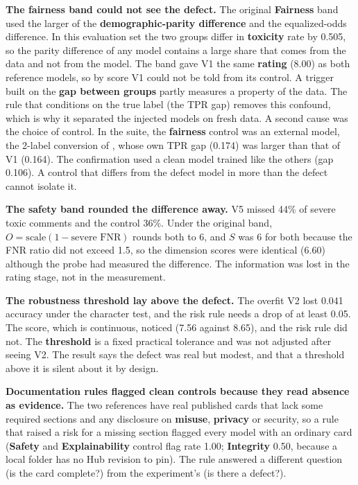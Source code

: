 \textbf{The fairness band could not see the defect.} The original \textbf{Fairness} band used the larger of the \textbf{demographic-parity difference} and the equalized-odds difference. In this evaluation set the two groups differ in \textbf{toxicity} rate by 0.505, so the parity difference of any model contains a large share that comes from the data and not from the model. The band gave V1 the same \textbf{rating} (8.00) as both reference models, so by score V1 could not be told from its control. A trigger built on the \textbf{gap between groups} partly measures a property of the data. The rule that conditions on the true label (the TPR gap) removes this confound, which is why it separated the injected models on fresh data. A second cause was the choice of control. In the suite, the \textbf{fairness} control was an external model, the 2-label conversion of , whose own TPR gap (0.174) was larger than that of V1 (0.164). The confirmation used a clean model trained like the others (gap 0.106). A control that differs from the defect model in more than the defect cannot isolate it.

\textbf{The safety band rounded the difference away.} V5 missed 44\% of severe toxic comments and the control 36\%. Under the original band, $O=\mathrm{scale}(1-\text{severe FNR})$ rounds both to 6, and $S$ was 6 for both because the FNR ratio did not exceed 1.5, so the dimension scores were identical (6.60) although the probe had measured the difference. The information was lost in the rating stage, not in the measurement.

\textbf{The robustness threshold lay above the defect.} The overfit V2 lost 0.041 accuracy under the character test, and the risk rule needs a drop of at least 0.05. The score, which is continuous, noticed (7.56 against 8.65), and the risk rule did not. The \textbf{threshold} is a fixed practical tolerance and was not adjusted after seeing V2. The result says the defect was real but modest, and that a threshold above it is silent about it by design.

\textbf{Documentation rules flagged clean controls because they read absence as evidence.} The two references have real published cards that lack some required sections and any disclosure on \textbf{misuse}, \textbf{privacy} or security, so a rule that raised a risk for a missing section flagged every model with an ordinary card (\textbf{Safety} and \textbf{Explainability} control flag rate 1.00; \textbf{Integrity} 0.50, because a local folder has no Hub revision to pin). The rule answered a different question (is the card complete?) from the experiment's (is there a defect?).

